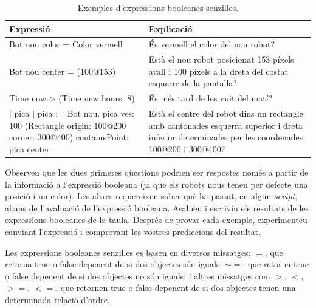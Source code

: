 \begin{table}[h]
\caption{Exemples d'expressions booleanes senzilles.}
\label{tab2001}
\setlength{\extrarowheight}{1mm}
{\small \begin{tabular}{p{70mm}p{70mm}}
\hline
\textbf{Expressió} & \textbf{Explicació} \\
\hline
\textsf{Bot nou color = Color vermell} & És vermell el color del nou robot? \\
\textsf{Bot nou center = (100@153)} & Està el nou robot posicionat 153 píxels avall i 100 píxels a la dreta del costat esquerre de  la pantalla?\\
\textsf{Time now \textgreater \hspace*{1mm} (Time new hours: 8)} & És més tard de les vuit del matí?\\
\textsf{
\noindent
\hspace*{-1mm}$|$ pica $|$ \newline 
pica := Bot nou. \newline
pica ves: 100 \newline
(Rectangle origin: 100@200 \newline
\hspace*{5mm} corner: 300@400)\newline
\hspace*{15mm} containsPoint: pica center
}
& 
Està el centre del robot dins un rectangle amb cantonades esquerra superior i dreta inferior determinades per les coordenades \textsf{100@200} i \textsf{300@400}?\\
\hline
\end{tabular}}
\end{table}

Observeu que les dues primeres qüestions podrien ser respostes només a partir de la informació a l'expressió booleana (ja que els robots nous tenen per defecte una posició i un color). Les altres requereixen saber què ha passat, en algun \emph{script}, abans de l'avaluació de l'expressió booleana. Avalueu i escriviu els resultats de les expressions booleanes de la taula. Després de provar cada exemple, experimenteu canviant l'expressió i comprovant les vostres prediccions del resultat.

Les expressions booleanes senzilles es basen en diversos missatges: \textsf{$=$}, que retorna \textsf{true} o \textsf{false} depenent de si dos objectes són iguals; \textsf{$\sim=$}, que retorna \textsf{true} o \textsf{false} depenent de si dos objectes no són iguals; i altres missatges com \textsf{$>$}, \textsf{$<$}, \textsf{$>=$}, \textsf{$<=$},  que retornen \textsf{true} o \textsf{false} depenent de si dos objectes tenen una determinada relació d'ordre. 

